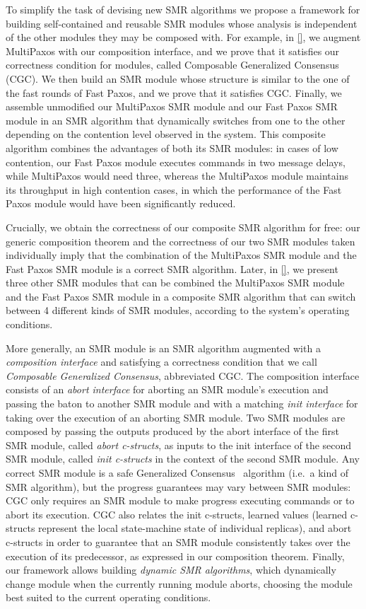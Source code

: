 To simplify the task of devising new SMR algorithms we propose a framework for
building self-contained and reusable SMR modules whose analysis is independent
of the other modules they may be composed with. For example, in \cref{}, we
augment MultiPaxos with our composition interface, and we prove that it satisfies
our correctness condition for modules, called Composable Generalized Consensus (CGC).
We then build an SMR module whose structure is similar to the one of the fast
rounds of Fast Paxos, and we prove that it satisfies CGC\@. Finally, we assemble
unmodified our MultiPaxos SMR module and our Fast Paxos SMR module in an SMR
algorithm that dynamically switches from one to the other depending on the
contention level observed in the system. This composite algorithm combines the
advantages of both its SMR modules: in cases of low contention, our Fast Paxos
module executes commands in two message delays, while MultiPaxos would need
three, whereas the MultiPaxos module maintains its throughput in high contention
cases, in which the performance of the Fast Paxos module would have been
significantly reduced.

Crucially, we obtain the correctness of our composite
SMR algorithm for free: our generic composition theorem and the correctness
of our two SMR modules taken individually imply that the combination of the
MultiPaxos SMR module and the Fast Paxos SMR module is a correct SMR algorithm.
Later, in \cref{}, we present three other SMR modules that can be combined the
MultiPaxos SMR module and the Fast Paxos SMR module in a composite SMR algorithm
that can switch between 4 different kinds of SMR modules, according to the
system's operating conditions.

More generally, an SMR module is an SMR algorithm augmented with a \emph{composition interface}
and satisfying a correctness condition that we call \emph{Composable Generalized
Consensus}, abbreviated CGC\@. The composition interface consists of an \emph{abort interface}
for aborting an SMR module's execution and passing the baton to another
SMR module and with a matching \emph{init interface} for taking over the
execution of an aborting SMR module. Two SMR modules are composed by passing
the outputs produced by the abort interface of the first SMR module, called
\emph{abort c-structs}, as inputs to the init interface of the second SMR module,
called \emph{init c-structs} in the context of the second SMR module. Any correct SMR module is a safe Generalized
Consensus~\cite{Lamport05GeneralizeConsensus} algorithm (i.e.\ a kind of SMR
algorithm), but the progress guarantees may vary between SMR modules: CGC only
requires an SMR module to make progress executing commands or to abort its
execution. CGC also relates the init c-structs, learned values (learned c-structs 
represent the local state-machine state of individual replicas), and abort
c-structs in order to guarantee that an SMR module consistently takes over the execution of its predecessor, as expressed in our composition theorem.
Finally, our framework allows building \emph{dynamic SMR
algorithms}, which dynamically change module when the currently running module
aborts, choosing the module best suited to the current operating conditions.

